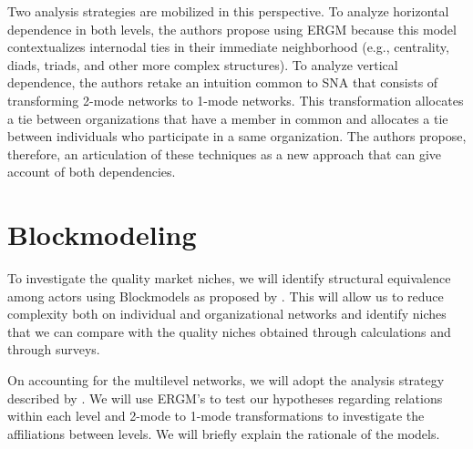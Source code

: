 \documentclass[a4paper, 12pt, openright, oneside, german, french, brazil, english]{abntex2}
\begin{document}
	Two analysis strategies are mobilized in this perspective. To analyze horizontal dependence in both levels, the authors propose using ERGM because this model contextualizes internodal ties in their immediate neighborhood (e.g., centrality, diads, triads, and other more complex structures). To analyze vertical dependence, the authors retake an intuition common to SNA that consists of transforming 2-mode networks to 1-mode networks. This transformation allocates a tie between organizations that have a member in common and allocates a tie between individuals who participate in a same organization. The authors propose, therefore, an articulation of these techniques as a new approach that can give account of both dependencies.

        
	
	
	\section{Blockmodeling}
	
	
        To investigate the quality market niches, we will identify structural equivalence among actors using Blockmodels as proposed by . This will allow us to reduce complexity both on individual and organizational networks and identify niches that we can compare with the quality niches obtained through calculations and through surveys.

        On accounting for the multilevel networks, we will adopt the analysis strategy described by . We will use ERGM's to test our hypotheses regarding relations within each level and 2-mode to 1-mode transformations to investigate the affiliations between levels. We will briefly explain the rationale of the models.
\end{document}
